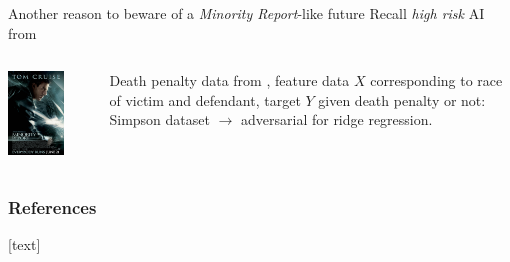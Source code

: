 \begin{frame}{Another reason to beware of a \emph{Minority Report}-like future}
  Recall \emph{high risk} AI from
  \begin{columns}[T] %
    \begin{column}{.48\textwidth}
      \includegraphics[width=0.7\textwidth]{graphics/wikimedia-Minority_Report_Poster}
      \cite{minority-report-poster}
    \end{column}%
    \begin{column}{.48\textwidth}
      Death penalty data from \cite{radelet1981racial}, feature data $X$ corresponding to race of victim and defendant, target $Y$ given death penalty or not: Simpson dataset $\rightarrow$ adversarial for ridge regression.
    \end{column}%
\end{columns}

\end{frame}

\begin{frame}[allowframebreaks]
  \frametitle{References}
  [text]
  
  
\end{frame}

